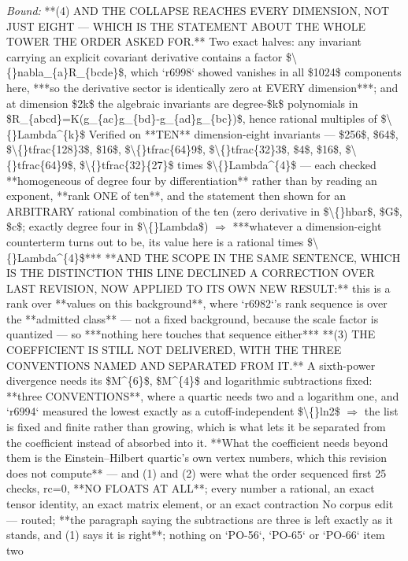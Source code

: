 \begin{description}
 \emph{Bound:}  **(4) AND THE COLLAPSE REACHES EVERY DIMENSION, NOT JUST EIGHT --- WHICH IS THE STATEMENT ABOUT THE WHOLE TOWER THE ORDER ASKED FOR.** Two exact halves: any invariant carrying an explicit covariant derivative contains a factor \$\textbackslash\{\}nabla\_\{a\}R\_\{bcde\}\$, which `r6998` showed vanishes in all \$1024\$ components here, ***so the derivative sector is identically zero at EVERY dimension***; and at dimension \$2k\$ the algebraic invariants are degree-\$k\$ polynomials in \$R\_\{abcd\}=K(g\_\{ac\}g\_\{bd\}-g\_\{ad\}g\_\{bc\})\$, hence rational multiples of \$\textbackslash\{\}Lambda\textasciicircum{}\{k\}\$  Verified on **TEN** dimension-eight invariants --- \$256\$, \$64\$, \$\textbackslash\{\}tfrac\{128\}3\$, \$16\$, \$\textbackslash\{\}tfrac\{64\}9\$, \$\textbackslash\{\}tfrac\{32\}3\$, \$4\$, \$16\$, \$\textbackslash\{\}tfrac\{64\}9\$, \$\textbackslash\{\}tfrac\{32\}\{27\}\$ times \$\textbackslash\{\}Lambda\textasciicircum{}\{4\}\$ --- each checked **homogeneous of degree four by differentiation** rather than by reading an exponent, **rank ONE of ten**, and the statement then shown for an ARBITRARY rational combination of the ten (zero derivative in \$\textbackslash\{\}hbar\$, \$G\$, \$c\$; exactly degree four in \$\textbackslash\{\}Lambda\$) \ensuremath{\Rightarrow} ***whatever a dimension-eight counterterm turns out to be, its value here is a rational times \$\textbackslash\{\}Lambda\textasciicircum{}\{4\}\$***  **AND THE SCOPE IN THE SAME SENTENCE, WHICH IS THE DISTINCTION THIS LINE DECLINED A CORRECTION OVER LAST REVISION, NOW APPLIED TO ITS OWN NEW RESULT:** this is a rank over **values on this background**, where `r6982`'s rank sequence is over the **admitted class** --- not a fixed background, because the scale factor is quantized --- so ***nothing here touches that sequence either***   **(3) THE COEFFICIENT IS STILL NOT DELIVERED, WITH THE THREE CONVENTIONS NAMED AND SEPARATED FROM IT.** A sixth-power divergence needs its \$M\textasciicircum{}\{6\}\$, \$M\textasciicircum{}\{4\}\$ and logarithmic subtractions fixed: **three CONVENTIONS**, where a quartic needs two and a logarithm one, and `r6994` measured the lowest exactly as a cutoff-independent \$\textbackslash\{\}ln2\$ \ensuremath{\Rightarrow} the list is fixed and finite rather than growing, which is what lets it be separated from the coefficient instead of absorbed into it. **What the coefficient needs beyond them is the Einstein--Hilbert quartic's own vertex numbers, which this revision does not compute** --- and (1) and (2) were what the order sequenced first  25 checks, rc=0, **NO FLOATS AT ALL**; every number a rational, an exact tensor identity, an exact matrix element, or an exact contraction  No corpus edit --- routed; **the paragraph saying the subtractions are three is left exactly as it stands, and (1) says it is right**; nothing on `PO-56`, `PO-65` or `PO-66` item two

\end{description}
